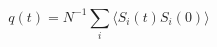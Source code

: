 \documentclass{jsarticle}
\begin{document}
\begin{equation}
  q(t) = N^{-1} \sum_{i} \langle S_{i}(t) S_{i}(0) \rangle
\end{equation}
\end{document}
